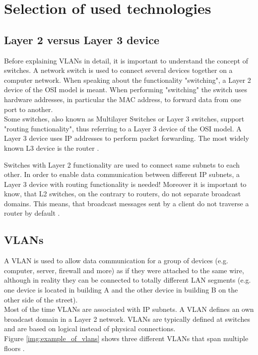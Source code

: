 \chapter{Selection of used technologies}

\thispagestyle{standard}
\pagestyle{standard}

\section{Layer 2 versus Layer 3 device}

Before explaining \acp{VLAN} in detail, it is important to understand the concept of switches. A network switch is used to connect several devices together on a computer network. When speaking about the functionality "switching", a Layer 2 device of the \ac{OSI} model is meant. When performing "switching" the switch uses hardware addresses, in particular the \ac{MAC} address, to forward data from one port to another. \\
Some switches, also known as Multilayer Switches or Layer 3 switches, support "routing functionality", thus referring to a Layer 3 device of the \ac{OSI} model. A Layer 3 device uses \ac{IP} addresses to perform packet forwarding. The most widely known L3 device is the router \cite{wiki:switch}. 

Switches with Layer 2 functionality are used to connect same subnets to each other. In order to enable data communication between different IP subnets, a Layer 3 device with routing functionality is needed! 
Moreover it is important to know, that L2 switches, on the contrary to routers, do not separate broadcast domains. This means, that broadcast messages sent by a client do not traverse a router by default \cite{wiki:switch}.

\section{VLANs}

A \ac{VLAN} is used to allow data communication for a group of devices (e.g. computer, server, firewall and more) as if they were attached to the same wire, although in reality they can be connected to totally different LAN segments (e.g. one device is located in building A and the other device in building B on the other side of the street). \\
Most of the time \acp{VLAN} are associated with \ac{IP} subnets. A \ac{VLAN} defines an own broadcast domain in a Layer 2 network. \acp{VLAN} are typically defined at switches and are based on logical instead of physical connections. \\
Figure \ref{img:example_of_vlans} shows three different \acp{VLAN} that span multiple floors \cite{cisco:vlan}. 

